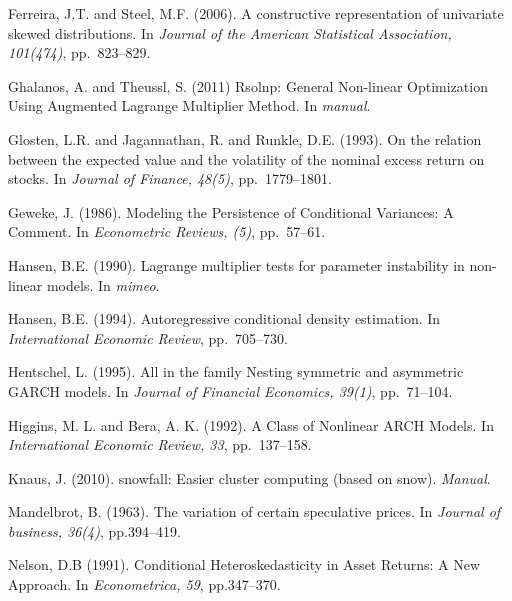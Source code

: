 \begin{thebibliography}{}
Ferreira, J.T. and Steel, M.F. (2006).
\newblock A constructive representation of univariate skewed distributions.
\newblock In \emph{Journal of the American Statistical Association, 101(474)}, pp.~823--829.

Ghalanos, A. and Theussl, S. (2011)
\newblock Rsolnp: General Non-linear Optimization Using Augmented Lagrange Multiplier Method.
\newblock In \emph{manual}.

Glosten, L.R. and Jagannathan, R. and Runkle, D.E. (1993).
\newblock On the relation between the expected value and the volatility of the nominal excess return on stocks.
\newblock In \emph{Journal of Finance, 48(5)}, pp.~1779--1801.

Geweke, J. (1986).
\newblock Modeling the Persistence of Conditional Variances: A Comment.
\newblock In \emph{Econometric Reviews, (5)}, pp.~57--61.

Hansen, B.E. (1990).
\newblock Lagrange multiplier tests for parameter instability in non-linear models.
\newblock In \emph{mimeo}.

Hansen, B.E. (1994).
\newblock Autoregressive conditional density estimation.
\newblock In \emph{International Economic Review}, pp.~705--730.

Hentschel, L. (1995).
\newblock All in the family Nesting symmetric and asymmetric GARCH models.
\newblock In \emph{Journal of Financial Economics, 39(1)}, pp.~71--104.

Higgins, M. L. and Bera, A. K. (1992).
\newblock A Class of Nonlinear ARCH Models.
\newblock In \emph{International Economic Review, 33}, pp.~137--158.

Knaus, J. (2010).
\newblock snowfall: Easier cluster computing (based on snow).
\newblock \emph{Manual}.

Mandelbrot, B. (1963).
\newblock The variation of certain speculative prices.
\newblock In \emph{Journal of business, 36(4)}, pp.394--419.

Nelson, D.B (1991).
\newblock Conditional Heteroskedasticity in Asset Returns: A New Approach.
\newblock In \emph{Econometrica, 59}, pp.347--370.


\end{thebibliography}
